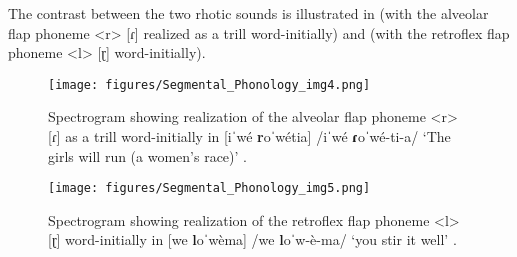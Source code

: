     \z
\z

The contrast between the two rhotic sounds is illustrated in  (with the alveolar flap phoneme <r> [\textup{ɾ}] realized as a trill word-initially) and  (with the retroflex flap phoneme <l> [ɽ] word-initially).

\begin{figure}
\texttt{[image: figures/Segmental\_Phonology\_img4.png]}
\caption{
\label{fig: alveolar flap illustration}
Spectrogram showing realization of the alveolar flap phoneme <r> [\textup{ɾ}] as a trill word-initially in [iˈwé \textbf{r}oˈwétia] /iˈwé \textbf{ɾ}oˈwé-ti-a/ `The girls will run (a women's race)' .}
\end{figure}

\begin{figure}
\texttt{[image: figures/Segmental\_Phonology\_img5.png]}
\caption{
\label{fig: retroflex flap illustration}
Spectrogram showing realization of the retroflex flap phoneme <l> [ɽ] word-initially in [we \textbf{l}oˈwèma] /we \textbf{l}oˈw-è-ma/ `you stir it well' .}
\end{figure}

